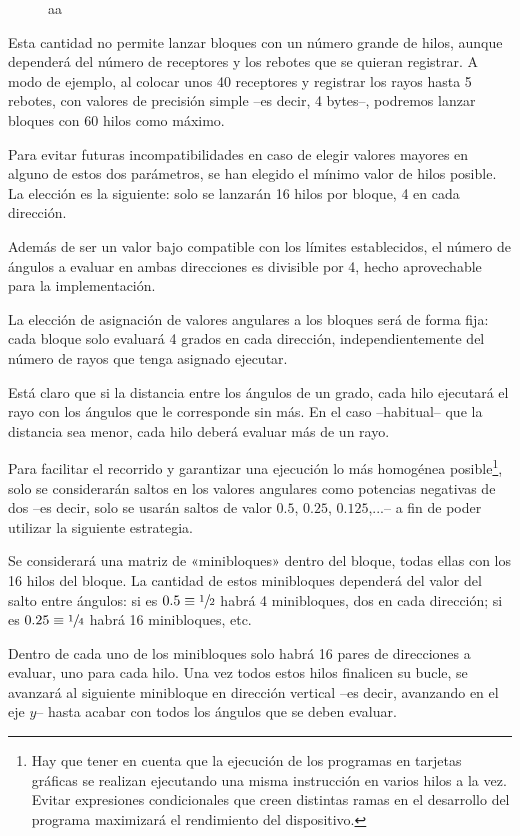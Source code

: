 \begin{figure}[H]
    \centering
    
    \caption{aa}
    \label{fig:CUDA_angulos}
\end{figure}

Esta cantidad no permite lanzar bloques con un número grande de hilos, aunque dependerá del número de receptores y los rebotes que se quieran registrar.
A modo de ejemplo, al colocar unos 40 receptores y registrar los rayos hasta 5 rebotes, con valores de precisión simple --es decir, 4 bytes--, podremos lanzar bloques con 60 hilos como máximo.

Para evitar futuras incompatibilidades en caso de elegir valores mayores en alguno de estos dos parámetros, se han elegido el mínimo valor de hilos posible.
La elección es la siguiente: solo se lanzarán 16 hilos por bloque, 4 en cada dirección.

Además de ser un valor bajo compatible con los límites establecidos, el número de ángulos a evaluar en ambas direcciones es divisible por 4, hecho aprovechable para la implementación.

La elección de asignación de valores angulares a los bloques será de forma fija: cada bloque solo evaluará 4 grados en cada dirección, independientemente del número de rayos que tenga asignado ejecutar.

Está claro que si la distancia entre los ángulos de un grado, cada hilo ejecutará el rayo con los ángulos que le corresponde sin más.
En el caso --habitual-- que la distancia sea menor, cada hilo deberá evaluar más de un rayo.

Para facilitar el recorrido y garantizar una ejecución lo más homogénea posible\footnote{Hay que tener en cuenta que la ejecución de los programas en tarjetas gráficas se realizan ejecutando una misma instrucción en varios hilos a la vez. Evitar expresiones condicionales que creen distintas ramas en el desarrollo del programa maximizará el rendimiento del dispositivo.}, solo se considerarán saltos en los valores angulares como potencias negativas de dos --es decir, solo se usarán saltos de valor $0.5$, $0.25$, $0.125$,...-- a fin de poder utilizar la siguiente estrategia.

Se considerará una matriz de «minibloques» dentro del bloque, todas ellas con los 16 hilos del bloque.
La cantidad de estos minibloques dependerá del valor del salto entre ángulos: si es $0.5 \equiv \sfrac{1}{2}$ habrá 4 minibloques, dos en cada dirección; si es $0.25 \equiv \sfrac{1}{4}$ habrá 16 minibloques, etc.

Dentro de cada uno de los minibloques solo habrá 16 pares de direcciones a evaluar, uno para cada hilo.
Una vez todos estos hilos finalicen su bucle, se avanzará al siguiente minibloque en dirección vertical --es decir, avanzando en el eje $y$-- hasta acabar con todos los ángulos que se deben evaluar.